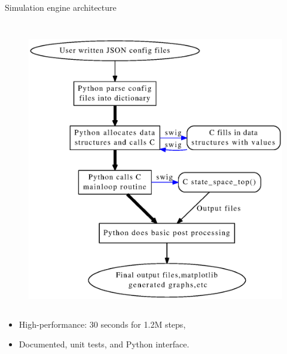 \documentclass[final]{beamer}
\begin{document}
\begin{frame}{}
\begin{columns}[t]
\begin{column}{.47\textwidth}
\begin{block}{Simulation engine architecture}
\begin{column}{0.35\textwidth}
\begin{figure}
	      \end{figure}		    
	    \end{column}
	   \begin{column}{0.6\textwidth}
	      \begin{figure}
		\centering
		\includegraphics[width=\textwidth]{shallowoutline.eps}
	      \end{figure}		    
	    \end{column}
	\begin{itemize}
	\vspace{1cm}
	 \item High-performance: 30 seconds for 1.2M steps,
	 \item Documented, unit tests, and Python interface.
	\end{itemize}

        \end{block}
        
      \end{column}
    \end{columns}
  \end{frame}
\end{document}
